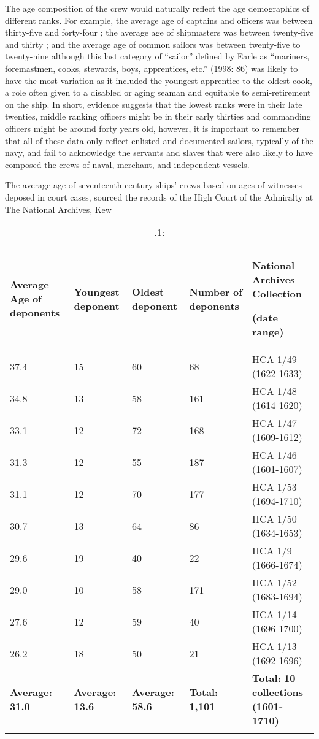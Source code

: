 The age composition of the crew would naturally reflect the age demographics of different ranks. For example, the average age of captains and officers was between thirty-five and forty-four \citep[86]{Earle1998}; the average age of shipmasters was between twenty-five and thirty \citep[38-39]{Walsh1994}; and the average age of common sailors was between twenty-five to twenty-nine \citep[86,]{Earle1998} although this last category of “sailor” defined by Earle as “mariners, foremastmen, cooks, stewards, boys, apprentices, etc.” (1998: 86) was likely to have the most variation as it included the youngest apprentice to the oldest cook, a role often given to a disabled or aging seaman and equitable to semi-retirement on the ship. In short, evidence suggests that the lowest ranks were in their late twenties, middle ranking officers might be in their early thirties and commanding officers might be around forty years old, however, it is important to remember that all of these data only reflect enlisted and documented sailors, typically of the navy, and fail to acknowledge the servants and slaves that were also likely to have composed the crews of naval, merchant, and independent vessels. 

\begin{table}
\caption{\label{tab:key:3}.1:} The average age of seventeenth century ships’ crews based on ages of witnesses deposed in court cases, sourced the records of the High Court of the Admiralty at The National Archives, Kew 

\begin{tabularx}{\textwidth}{XXXXX}
\lsptoprule

 \textbf{Average} \textbf{Age} \textbf{of} \textbf{deponents} &  \textbf{Youngest} \textbf{deponent} &  \textbf{Oldest} \textbf{deponent} &  \textbf{Number} \textbf{of} \textbf{deponents} &  \textbf{National} \textbf{Archives} \textbf{Collection} \par

 \textbf{(date} \textbf{range)}\\
 37.4 &  15 &  60 &  68 &  HCA 1/49 (1622-1633)\\
 34.8 &  13 &  58 &  161 &  HCA 1/48 (1614-1620)\\
 33.1 &  12 &  72 &  168 &  HCA 1/47 (1609-1612)\\
 31.3 &  12 &  55 &  187 &  HCA 1/46 (1601-1607)\\
 31.1 &  12 &  70 &  177 &  HCA 1/53 (1694-1710)\\
 30.7 &  13 &  64 &  86 &  HCA 1/50 (1634-1653)\\
 29.6 &  19 &  40 &  22 &  HCA 1/9 (1666-1674)\\
 29.0 &  10 &  58 &  171 &  HCA 1/52 (1683-1694)\\
 27.6 &  12 &  59 &  40 &  HCA 1/14 (1696-1700)\\
 26.2 &  18 &  50 &  21 &  HCA 1/13 (1692-1696)\\
 \textbf{Average:} \textbf{31.0} &  \textbf{Average:} \textbf{13.6} &  \textbf{Average:} \textbf{58.6} &  \textbf{Total:} \textbf{1,101} & \textbf{Total:} \textbf{10} \textbf{collections} \textbf{(1601-1710)}\\
\lspbottomrule
\end{tabularx}\end{table}
